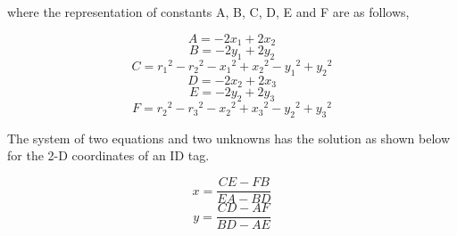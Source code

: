 \medskip
where the representation of constants A, B, C, D, E and F are as follows,

\begin{equation*}
	A = -2x_1 + 2x_2
\end{equation*}
\begin{equation*}
	B = -2y_1 + 2y_2
\end{equation*}
\begin{equation*}
	C = {r_1}^2 - {r_2}^2 - {x_1}^2 + {x_2}^2 - {y_1}^2 + {y_2}^2
\end{equation*}
\begin{equation*}
	D = -2x_2 + 2x_3
\end{equation*}
\begin{equation*}
	E = -2y_2 + 2y_3
\end{equation*}
\begin{equation*}
	F = {r_2}^2 - {r_3}^2 - {x_2}^2 + {x_3}^2 - {y_2}^2 + {y_3}^2
\end{equation*}

\medskip
The system of two equations and two unknowns has the solution as shown below for the 2-D coordinates of an ID tag.

\begin{equation*}
	x = \frac{CE - FB} {EA - BD}
\end{equation*}
\begin{equation*}
	y = \frac{CD - AF} {BD - AE}
\end{equation*}


\pagebreak
